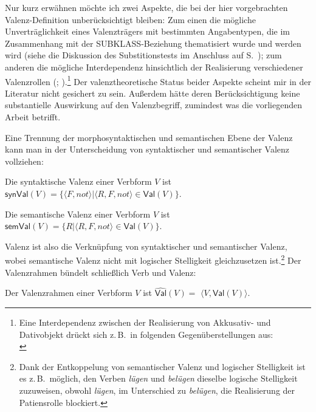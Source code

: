 Nur kurz erwähnen möchte ich zwei Aspekte, die bei der hier vorgebrachten Valenz-Defini\-tion unberücksichtigt bleiben: Zum einen die mögliche Unverträglichkeit eines Valenzträgers mit bestimmten Angabentypen, die im Zusammenhang mit der SUBKLASS-Bezie\-hung thematisiert wurde und werden wird (siehe die Diskussion des Substitionstests im Anschluss auf S.~\pageref{par-subsitutionstest}); zum anderen die mögliche Interdependenz hinsichtlich der Realisierung verschiedener Valenzrollen (\citealt[306ff]{Jacobs:94a}; \citealt[397f]{Jacobs:03}).\footnote{Eine Interdependenz zwischen der Realisierung von Akkusativ- und Dativobjekt drückt sich z.\,B.\ in folgenden Gegenüberstellungen aus:\\
} Der valenztheoretische Status beider Aspekte scheint mir in der Literatur nicht gesichert zu sein. Au\ss erdem hätte deren Berücksichtigung keine substantielle Auswirkung auf den Valenzbegriff, zumindest was die vorliegenden Arbeit betrifft.     

Eine Trennung der morphosyntaktischen und semantischen Ebene der Valenz kann man in der Unterscheidung von syntaktischer und semantischer Valenz vollziehen:  
\begin{definition}
Die syntaktische Valenz einer Verbform $V$ ist \linebreak $\mathsf{synVal}(V) = \{\langle F,not \rangle | \langle R,F,not \rangle \in \mathsf{Val}(V) \}$.
\end{definition}
\begin{definition}
Die semantische Valenz einer Verbform $V$ ist \linebreak $\mathsf{semVal}(V) = \{R | \langle R,F,not \rangle \in \mathsf{Val}(V) \}$.
\end{definition}
Valenz ist also die Verknüpfung von syntaktischer und semantischer Valenz, wobei semantische Valenz nicht mit logischer Stelligkeit gleichzusetzen ist.\footnote{Dank der Entkoppelung von semantischer Valenz und logischer Stelligkeit ist es z.\,B.\ möglich, den Verben {\it lügen} und {\it belügen} dieselbe logische Stelligkeit zuzuweisen, obwohl {\it lügen}, im Unterschied zu {\it belügen}, die Realisierung der Patiensrolle blockiert.}  Der Valenzrahmen bündelt schlie\ss lich Verb und Valenz:
\begin{definition}[Valenzrahmen]
Der Valenzrahmen einer Verbform $V$ ist $\widehat{\mathsf{Val}}(V) =$ $\langle V, \mathsf{Val}(V) \rangle$.
\end{definition}

